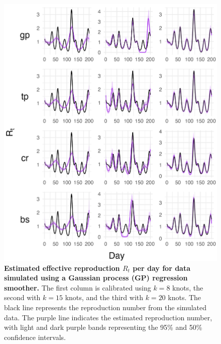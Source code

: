\documentclass[
11pt, %
oneside, %
english, %
singlespacing, %
]{macthesis} %
\begin{document}
\begin{figure}[H]
\centering
\includegraphics[width=\textwidth]{figure/Simulated/simulation_gp(-2,2,1)_k(20)_k(8,15,20)_bsd2_beta2_plot_R_t.png}
\caption[Estimated Simulated Data (GP) Effective Reproduction Number]{\textbf{Estimated effective reproduction \(R_t\) per day for data simulated using a Gaussian process (GP) regression smoother.} The first column is calibrated using \(k=8\) knots, the second with \(k=15\) knots, and the third with \(k=20\) knots. The black line represents the reproduction number from the simulated data. The purple line indicates the estimated reproduction number, with light and dark purple bands representing the 95\% and 50\% confidence intervals.}
\label{fig:Rt20gp}
\end{figure}
\end{document}
